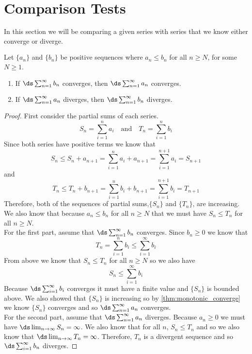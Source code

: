 \section{Comparison Tests}\label{sec:comp_tests}

In this section we will be comparing a given series with series that we know either converge or diverge.

{Let $\{a_n\}$ and $\{b_n\}$ be positive sequences where $a_n\leq b_n$ for all $n\geq N$,
for some $N\geq 1$. 
\begin{enumerate}
	\item If $\ds \sum_{n=1}^\infty b_n$ converges, then $\ds \sum_{n=1}^\infty a_n$ converges.
	\item	If $\ds \sum_{n=1}^\infty a_n$ diverges, then $\ds \sum_{n=1}^\infty b_n$ diverges.
\end{enumerate}}


\begin{proof}
First consider the partial sums of each series.
$$S_n=\sum_{i=1}^n a_i \quad \text{and} \quad T_n=\sum_{i=1}^n b_i$$
Since both series have positive terms we know that
$$S_n\leq S_n+a_{n+1}=\sum_{i=1}^n a_i+a_{n+1}=\sum_{i=1}^{n+1} a_i=S_{n+1}$$
and
$$T_n\leq T_n+b_{n+1}=\sum_{i=1}^n b_i+b_{n+1}=\sum_{i=1}^{n+1} b_i=T_{n+1}$$
Therefore, both of the sequences of partial sums,$\{S_n\}$ and $\{T_n\}$, are increasing. We also know that because $a_n\leq b_n$ for all $n\geq N$ that we must have $S_n\leq T_n$ for all $n\geq N$. \\
For the first part, assume that $\ds \sum_{n=1}^\infty b_n$ converges. Since $b_n\geq 0$ we know that 
$$T_n=\sum_{i=1}^n b_i\leq \sum_{i=1}^\infty b_i$$
From above we know that $S_n\leq T_n$ for all $n\geq N$ so we also have
$$S_n\leq \sum_{i=1}^\infty b_i$$
Because $\ds \sum_{i=1}^\infty b_i$ converges it must have a finite value and $\{S_n\}$ is bounded above. We also showed that $\{S_n\}$ is increasing so by \autoref{thm:monotonic_converge} we know $\{S_n\}$ converges and so $\ds \sum_{n=1}^\infty a_n$ converges.   \\
For the second part, assume that $\ds \sum_{n=1}^\infty a_n$ diverges. Because $a_n\geq 0$ we must have $\ds \lim_{n\to \infty} S_n=\infty$. We also know that for all $n$, $S_n\leq T_n$ and so we also know that $\ds \lim_{n\to \infty} T_n=\infty$. Therefore, ${T_n}$ is a divergent sequence and so $\ds \sum_{i=1}^\infty b_n$ diverges.
\end{proof}

